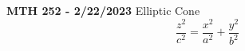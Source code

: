 \documentclass{book}
\title {}
\author{}
\date{}
\begin{document}
\textbf{MTH 252 - 2/22/2023}
Elliptic Cone
\[\frac{z^2}{c^2} = \frac{x^2}{a^2} + \frac{y^2}{b^2} \]

\end{document}
